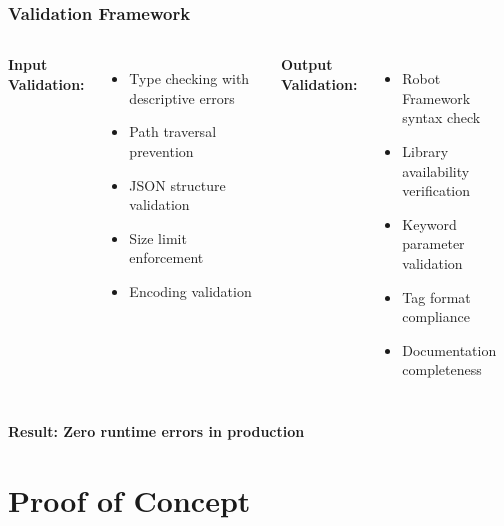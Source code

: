 \begin{frame}
\frametitle{Validation Framework}
\begin{columns}
\textbf{Input Validation:}
\begin{itemize}
    \item Type checking with descriptive errors
    \item Path traversal prevention
    \item JSON structure validation
    \item Size limit enforcement
    \item Encoding validation
\end{itemize}

\textbf{Output Validation:}
\begin{itemize}
    \item Robot Framework syntax check
    \item Library availability verification
    \item Keyword parameter validation
    \item Tag format compliance
    \item Documentation completeness
\end{itemize}
\end{columns}

\vspace{0.3cm}
\begin{center}
\textbf{Result: Zero runtime errors in production}
\end{center}
\end{frame}

\section{Proof of Concept}

